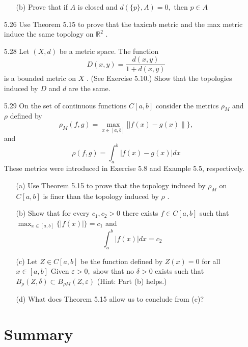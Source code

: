 \documentclass[12pt]{article}
\begin{document}
\begin{enumerate}
\begin{enumerate}
		\item[(b)] Prove that if $A$ is closed and $d ( \{ p \} , A ) = 0 ,$ then $p \in A$
		
	\end{enumerate}
	
	\item[5.26] Use Theorem 5.15 to prove that the taxicab metric and the max metric induce
	the same topology on $\mathbb { R } ^ { 2 }$ .
	
	\item[5.28] Let $( X , d )$ be a metric space. The function
		\[D ( x , y ) = \frac { d ( x , y ) } { 1 + d ( x , y ) }\]
	is a bounded metric on $X$ . (See Exercise 5.10.) Show that the topologies
	induced by $D$ and $d$ are the same.
	
	\item[5.29] On the set of continuous functions $C [ a , b ]$ consider the metrics $\rho _ { M }$ and $\rho$ defined by
	\[\rho _ { M } ( f , g ) = \max _ { x \in [ a , b ] } [ | f ( x ) - g ( x ) \| \} ,\] and
	\[\rho ( f , g ) = \int _ { a } ^ { b } | f ( x ) - g ( x ) | d x\]
	These metrics were introduced in Exercise 5.8 and Example 5.5, respectively.
	\begin{enumerate}
		\item[(a)] Use Theorem 5.15 to prove that the topology induced by $\rho _ { M }$ on $C [ a , b ]$ is finer than the topology induced by $\rho$ .
		\item[(b)] Show that for every $c _ { 1 } , c _ { 2 } > 0$ there exists $f \in C [ a , b ]$ such that\\
		$\max _ { x \in [ a , b ] } \{ | f ( x ) | \} = c _ { 1 }$ and
		\[\int _ { a } ^ { b } | f ( x ) | d x = c _ { 2 }\]
		\item[(c)] Let $Z \in C [ a , b ]$ be the function defined by $Z ( x ) = 0$ for all $x \in [ a , b ]$
		Given $\varepsilon > 0 ,$ show that no $\delta > 0$ exists such that $B _ { \rho } ( Z , \delta ) \subset B _ { \rho M} ( Z , \varepsilon )$
		(Hint: Part (b) helps.)
		\item[(d)] What does Theorem 5.15 allow us to conclude from (c)?
	\end{enumerate}

	\section*{Summary}

\end{enumerate}
 
\end{document}
